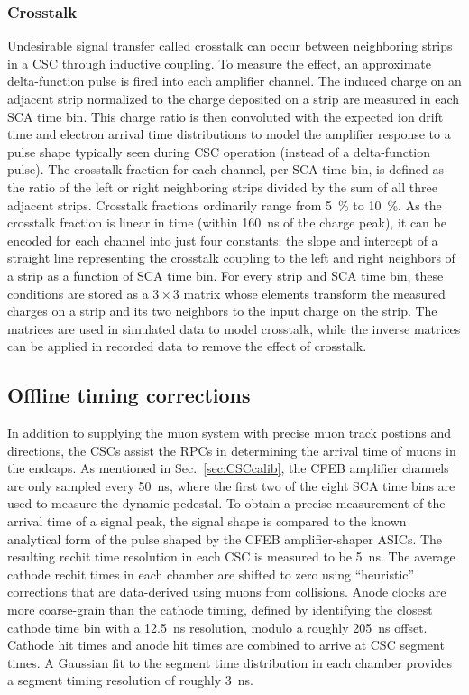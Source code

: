 \subsubsection{Crosstalk}
Undesirable signal transfer called crosstalk can occur between neighboring strips in a CSC through inductive coupling. To measure the effect, an approximate delta-function pulse is fired into each amplifier channel. The induced charge on an adjacent strip normalized to the charge deposited on a strip are measured in each SCA time bin. This charge ratio is then convoluted with the expected ion drift time and electron arrival time distributions to model the amplifier response to a pulse shape typically seen during CSC operation (instead of a delta-function pulse). The  crosstalk fraction for each channel, per SCA time bin, is defined as the ratio of the left or right neighboring strips divided by the sum of all three adjacent strips. Crosstalk fractions ordinarily range from 5~\% to 10~\%. As the crosstalk fraction is linear in time (within \SI{160}{ns} of the charge peak), it can be encoded for each channel into just four constants: the slope and intercept of a straight line representing the crosstalk coupling to the left and right neighbors of a strip as a function of SCA time bin. For every strip and SCA time bin, these conditions are stored as a $3\times3$ matrix whose elements transform the measured charges on a strip and its two neighbors to the input charge on the strip. The matrices are used in simulated data to model crosstalk, while the inverse matrices can be applied in recorded data to remove the effect of crosstalk.

\subsection{Offline timing corrections}

In addition to supplying the muon system with precise muon track postions and directions, the CSCs assist the RPCs in determining the arrival time of muons in the endcaps. As mentioned in Sec.~\ref{sec:CSCcalib}, the CFEB amplifier channels are only sampled every \SI{50}{ns}, where the first two of the eight SCA time bins are used to measure the dynamic pedestal. To obtain a precise measurement of the arrival time of a signal peak, the signal shape is compared to the known analytical form of the pulse shaped by the CFEB amplifier-shaper ASICs. The resulting rechit time resolution in each CSC is measured to be \SI{5}{ns}. The average cathode rechit times in each chamber are shifted to zero using ``heuristic'' corrections that are data-derived using muons from collisions. Anode clocks are more coarse-grain than the cathode timing, defined by identifying the closest cathode time bin with a \SI{12.5}{ns} resolution, modulo a roughly \SI{205}{ns} offset. Cathode hit times and anode hit times are combined to arrive at CSC segment times. A Gaussian fit to the segment time distribution in each chamber provides a segment timing resolution of roughly \SI{3}{ns}.

